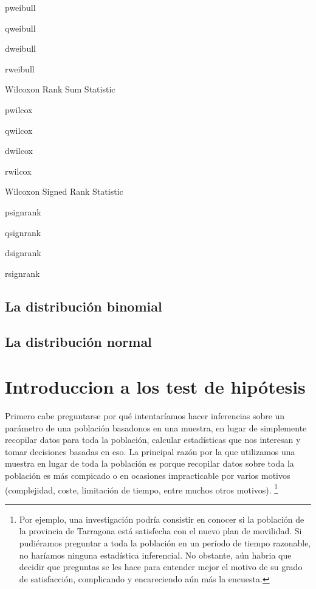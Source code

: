 \documentclass[
]{book}
\begin{document}
pweibull

qweibull

dweibull

rweibull

Wilcoxon Rank Sum Statistic

pwilcox

qwilcox

dwilcox

rwilcox

Wilcoxon Signed Rank Statistic

psignrank

qsignrank

dsignrank

rsignrank

\hypertarget{la-distribuciuxf3n-binomial}{%
\subsection{La distribución binomial}\label{la-distribuciuxf3n-binomial}}

\hypertarget{la-distribuciuxf3n-normal}{%
\subsection{La distribución normal}\label{la-distribuciuxf3n-normal}}

\hypertarget{introduccion-a-los-test-de-hipuxf3tesis}{%
\section{Introduccion a los test de hipótesis}\label{introduccion-a-los-test-de-hipuxf3tesis}}

Primero cabe preguntarse por qué intentaríamos hacer inferencias sobre un parámetro de una población basadonos en una muestra, en lugar de simplemente recopilar datos para toda la población, calcular estadísticas que nos interesan y tomar decisiones basadas en eso. La principal razón por la que utilizamos una muestra en lugar de toda la población es porque recopilar datos sobre toda la población es más compicado o en ocasiones impracticable por varios motivos (complejidad, coste, limitación de tiempo, entre muchos otros motivos). \footnote{Por ejemplo, una investigación podría consistir en conocer si la población de la provincia de Tarragona está satisfecha con el nuevo plan de movilidad. Si pudiéramos preguntar a toda la población en un período de tiempo razonable, no haríamos ninguna estadística inferencial. No obstante, aún habria que decidir que preguntas se les hace para entender mejor el motivo de su grado de satisfacción, complicando y encareciendo aún más la encuesta.}
\end{document}
